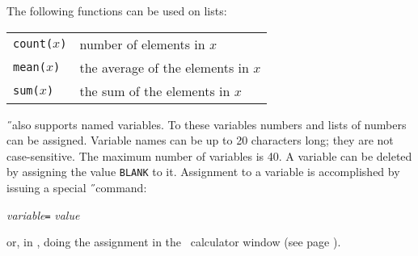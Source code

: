 The following functions can be used on lists:

{\small
\begin{tabular}{ll}
{\tt count($x$)}&number of elements in $x$\\
{\tt mean($x$)}&the average of the elements in $x$\\
{\tt sum($x$)}&the sum of the elements in $x$\\
\end{tabular}
}

\H\ also supports named variables.
To these variables numbers and lists of numbers can be assigned. 
Variable names can be up to 20 characters long; they are not case-sensitive.
The maximum number of variables is 40.
A variable can be deleted by assigning the value {\tt BLANK} to it.
Assignment to a variable is accomplished by issuing a special \H\ command:

{\it variable}{\tt =}{ \it value}

or, in \tH, doing the assignment in the \tH\ calculator window (see page
\pageref{calculator}).

